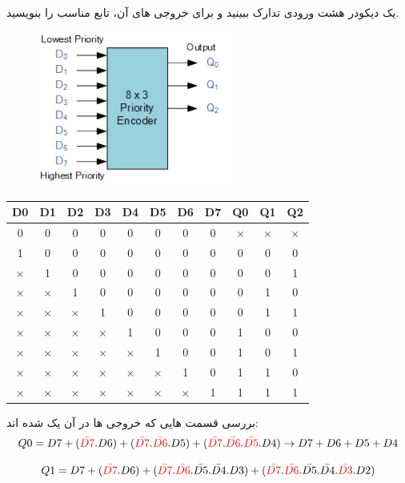 \documentclass[20pt, a4paper]{article}
\begin{document}
یک دیکودر هشت ورودی تدارک ببینید و برای خروجی های آن، تابع مناسب را بنویسید.

\begin{figure}[htbp]\centering
	\centerline{\includegraphics[width=180pt]{img/lastest/encoderProblem.jpg}}
\end{figure}

\begin{LTR}
	\begin{tabular}{ c c c c c c c c | c | c | c }
		D0 & D1 & D2 & D3 & D4 & D5 & D6 & D7 & Q0 & Q1 & Q2\\
		\hline
		0 & 0 & 0 & 0 & 0 & 0 & 0 & 0 & × & × & ×\\
		1 & 0 & 0 & 0 & 0 & 0 & 0 & 0 & 0 & 0 & 0\\
		× & 1 & 0 & 0 & 0 & 0 & 0 & 0 & 0 & 0 & 1\\
		× & × & 1 & 0 & 0 & 0 & 0 & 0 & 0 & 1 & 0\\
		× & × & × & 1 & 0 & 0 & 0 & 0 & 0 & 1 & 1\\
		× & × & × & × & 1 & 0 & 0 & 0 & 1 & 0 & 0\\
		× & × & × & × & × & 1 & 0 & 0 & 1 & 0 & 1\\
		× & × & × & × & × & × & 1 & 0 & 1 & 1 & 0\\
		× & × & × & × & × & × & × & 1 & 1 & 1 & 1\\
	\end{tabular}
\end{LTR}
\hfill \break
بررسی قسمت هایی که خروجی ها در آن یک شده اند:\\

\begin{equation}
	Q0 = D7 + 
	(\textcolor{red}{\bar{D7}}.D6) + 
	(\textcolor{red}{\bar{D7}}.\textcolor{red}{\bar{D6}}.D5)+
	(\textcolor{red}{\bar{D7}}.\textcolor{red}{\bar{D6}}.\textcolor{red}{\bar{D5}}.D4)
	\rightarrow D7+D6+D5+D4
\end{equation}

\begin{equation}
	Q1 = D7 +
	(\textcolor{red}{\bar{D7}}.D6)+
	(\textcolor{red}{\bar{D7}}.\textcolor{red}{\bar{D6}}.\bar{D5}.\bar{D4}.D3)+
	(\textcolor{red}{\bar{D7}}.\textcolor{red}{\bar{D6}}.\bar{D5}.\bar{D4}.\textcolor{red}{\bar{D3}}.D2)
\end{equation}
\end{document}
